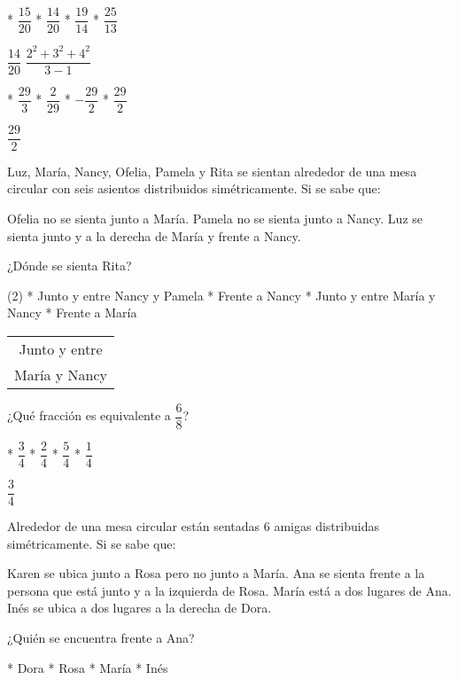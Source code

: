 \begin{task}
	* $\dfrac{15}{20}$
	* $\dfrac{14}{20}$
	* $\dfrac{19}{14}$
	* $\dfrac{25}{13}$
\end{task}
$\dfrac{14}{20}$
$\dfrac{2^2+3^2+4^2}{3-1}$
\begin{enum}
	* $\dfrac{29}{3}$
	* $\dfrac{2}{29}$
	* $-\dfrac{29}{2}$
	* $\dfrac{29}{2}$
\end{enum}
$\dfrac{29}{2}$
\begin{minipage}{.8\linewidth}
	Luz, Mar\'ia, Nancy, Ofelia, Pamela y Rita se sientan alrededor de una mesa circular con seis asientos distribuidos sim\'etricamente. Si se sabe que:
	\begin{itemize}
		\ii Ofelia no se sienta junto a Mar\'ia.
		\ii Pamela no se sienta junto a Nancy.
		\ii Luz se sienta junto y a la derecha de Mar\'ia y frente a Nancy.
	\end{itemize}
	¿D\'onde se sienta Rita?
\end{minipage}
\begin{minipage}{.9\linewidth}
	\begin{enum}(2)
		* Junto y entre Nancy y Pamela
		* Frente a Nancy
		* Junto y entre Mar\'ia y Nancy
		* Frente a Mar\'ia
	\end{enum}
\end{minipage}
\begin{tabular}{c}
	Junto y entre \\
	Mar\'ia y Nancy
\end{tabular}
¿Qu\'e fracci\'on es equivalente a $\dfrac{6}{8}$?
\begin{task}
	* $\dfrac{3}{4}$
	* $\dfrac{2}{4}$
	* $\dfrac{5}{4}$
	* $\dfrac{1}{4}$
\end{task}
$\dfrac{3}{4}$
\begin{minipage}{.8\linewidth}
	Alrededor de una mesa circular est\'an sentadas $6$ amigas distribuidas sim\'etricamente. Si se sabe que:
	\begin{itemize}
		\ii Karen se ubica junto a Rosa pero no junto a Mar\'ia.
		\ii Ana se sienta frente a la persona que est\'a junto y a la izquierda de Rosa.
		\ii Mar\'ia est\'a a dos lugares de Ana.
		\ii In\'es se ubica a dos lugares a la derecha de Dora.
	\end{itemize}
	¿Qui\'en se encuentra frente a Ana?
\end{minipage}
\begin{task}
	* Dora
	* Rosa
	* Mar\'ia
	* In\'es
\end{task}
